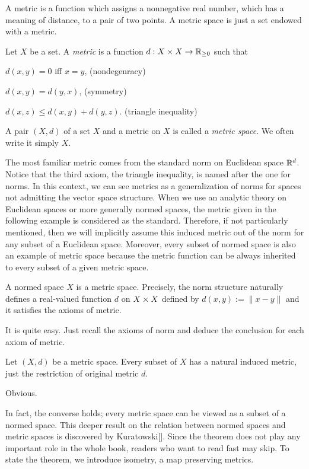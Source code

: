 \documentclass{../crs}
\begin{document}
A metric is a function which assigns a nonnegative real number, which has a meaning of distance, to a pair of two points.
A metric space is just a set endowed with a metric.

\begin{defn}
Let $X$ be a set.
A \emph{metric} is a function $d:X\x X\to\R_{\ge0}$ such that
\begin{cond}
\item $d(x,y)=0$ iff $x=y$, \hfill(nondegenracy)
\item $d(x,y)=d(y,x)$, \hfill(symmetry)
\item $d(x,z)\le d(x,y)+d(y,z)$. \hfill(triangle inequality)
\end{cond}
A pair $(X,d)$ of a set $X$ and a metric on $X$ is called a \emph{metric space}.
We often write it simply $X$.
\end{defn}

The most familiar metric comes from the standard norm on Euclidean space $\mathbb{R}^d$.
Notice that the third axiom, the triangle inequality, is named after the one for norms.
In this context, we can see metrics as a generalization of norms for spaces not admitting the vector space structure.
When we use an analytic theory on Euclidean spaces or more generally normed spaces, the metric given in the following example is considered as the standard.
Therefore, if not particularly mentioned, then we will implicitly assume this induced metric out of the norm for any subset of a Euclidean space.
Moreover, every subset of normed space is also an example of metric space because the metric function can be always inherited to every subset of a given metric space.

\begin{ex}
A normed space $X$ is a metric space.
Precisely, the norm structure naturally defines a real-valued function $d$ on $X\times X$ defined by $d(x,y):=\|x-y\|$ and it satisfies the axioms of metric.
\end{ex}
\begin{pf}
It is quite easy.
Just recall the axioms of norm and deduce the conclusion for each axiom of metric.
\end{pf}
\begin{ex}
Let $(X,d)$ be a metric space.
Every subset of $X$ has a natural induced metric, just the restriction of original metric $d$.
\end{ex}
\begin{pf}
Obvious.
\end{pf}

In fact, the converse holds; every metric space can be viewed as a subset of a normed space.
This deeper result on the relation between normed spaces and metric spaces is discovered by Kuratowski[].
Since the theorem does not play any important role in the whole book, readers who want to read fast may skip.
To state the theorem, we introduce isometry, a map preserving metrics.
\end{document}
